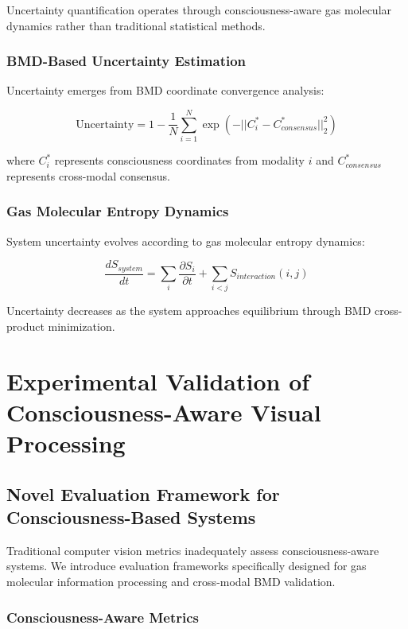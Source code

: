 \documentclass[12pt,a4paper]{article}
\begin{document}
Uncertainty quantification operates through consciousness-aware gas molecular dynamics rather than traditional statistical methods.

\subsubsection{BMD-Based Uncertainty Estimation}

Uncertainty emerges from BMD coordinate convergence analysis:

\begin{equation}
\text{Uncertainty} = 1 - \frac{1}{N} \sum_{i=1}^{N} \exp\left(-||C_i^* - C_{consensus}^*||_2^2\right)
\end{equation}

where $C_i^*$ represents consciousness coordinates from modality $i$ and $C_{consensus}^*$ represents cross-modal consensus.

\subsubsection{Gas Molecular Entropy Dynamics}

System uncertainty evolves according to gas molecular entropy dynamics:

\begin{equation}
\frac{dS_{system}}{dt} = \sum_i \frac{\partial S_i}{\partial t} + \sum_{i<j} S_{interaction}(i,j)
\end{equation}

Uncertainty decreases as the system approaches equilibrium through BMD cross-product minimization.

\section{Experimental Validation of Consciousness-Aware Visual Processing}

\subsection{Novel Evaluation Framework for Consciousness-Based Systems}

Traditional computer vision metrics inadequately assess consciousness-aware systems. We introduce evaluation frameworks specifically designed for gas molecular information processing and cross-modal BMD validation.

\subsubsection{Consciousness-Aware Metrics}
\end{document}
